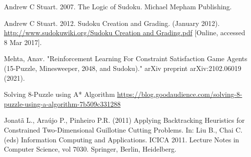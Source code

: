 \documentclass{svproc}
\begin{document}
\begin{thebibliography}{6}
Andrew C Stuart. 2007. The Logic of Sudoku. Michael Mepham Publishing.

Andrew C Stuart. 2012. Sudoku Creation and Grading. (January 2012).
\url{http://www.sudokuwiki.org/Sudoku Creation and Grading.pdf}
[Online, accessed 8 Mar 2017].

Mehta, Anav. "Reinforcement Learning For Constraint Satisfaction Game Agents (15-Puzzle, Minesweeper, 2048, and Sudoku)." arXiv preprint arXiv:2102.06019 (2021).

Solving 8-Puzzle using A* Algorithm
\url{https://blog.goodaudience.com/solving-8-puzzle-using-a-algorithm-7b509c331288}

Jonatã L., Araújo P., Pinheiro P.R. (2011) Applying Backtracking Heuristics for Constrained Two-Dimensional Guillotine Cutting Problems. In: Liu B., Chai C. (eds) Information Computing and Applications. ICICA 2011. Lecture Notes in Computer Science, vol 7030. Springer, Berlin, Heidelberg.

\end{thebibliography}
\end{document}
